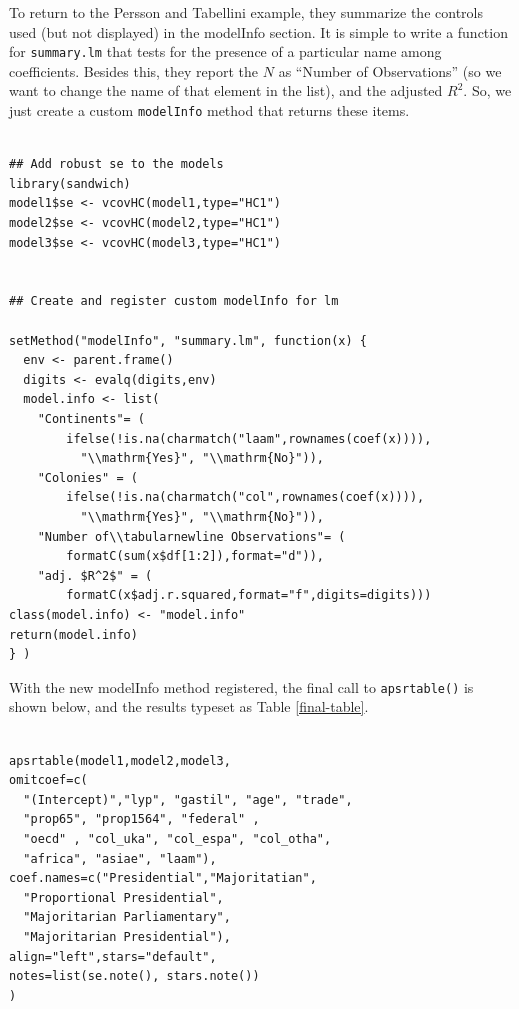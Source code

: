 \documentclass[10pt]{article} %
\begin{document}
To return to the Persson and Tabellini example, they summarize the controls used (but not displayed) in the modelInfo section. It is simple to write a function for \verb|summary.lm| that tests for the presence of a particular name among coefficients. Besides this, they report the $N$ as ``Number of Observations'' (so we want to change the name of that element in the list), and the adjusted $R^2$. So, we just create a custom \verb|modelInfo| method that returns these items.
\begin{verbatim}

## Add robust se to the models
library(sandwich)
model1$se <- vcovHC(model1,type="HC1")
model2$se <- vcovHC(model2,type="HC1")
model3$se <- vcovHC(model3,type="HC1")


## Create and register custom modelInfo for lm

setMethod("modelInfo", "summary.lm", function(x) {
  env <- parent.frame()
  digits <- evalq(digits,env)
  model.info <- list(
    "Continents"= (
        ifelse(!is.na(charmatch("laam",rownames(coef(x)))),
          "\\mathrm{Yes}", "\\mathrm{No}")),
    "Colonies" = (
        ifelse(!is.na(charmatch("col",rownames(coef(x)))),
          "\\mathrm{Yes}", "\\mathrm{No}")),
    "Number of\\tabularnewline Observations"= (
        formatC(sum(x$df[1:2]),format="d")),
    "adj. $R^2$" = (
        formatC(x$adj.r.squared,format="f",digits=digits)))
class(model.info) <- "model.info"
return(model.info)
} )

\end{verbatim}

With the new modelInfo method registered, the final call to \verb|apsrtable()| is shown below, and the results typeset as Table \ref{final-table}. 
\begin{verbatim}

apsrtable(model1,model2,model3,
omitcoef=c(
  "(Intercept)","lyp", "gastil", "age", "trade", 
  "prop65", "prop1564", "federal" ,
  "oecd" , "col_uka", "col_espa", "col_otha",
  "africa", "asiae", "laam"),
coef.names=c("Presidential","Majoritatian",
  "Proportional Presidential",
  "Majoritarian Parliamentary",
  "Majoritarian Presidential"),
align="left",stars="default",
notes=list(se.note(), stars.note())
)
\end{verbatim}
\end{document}
